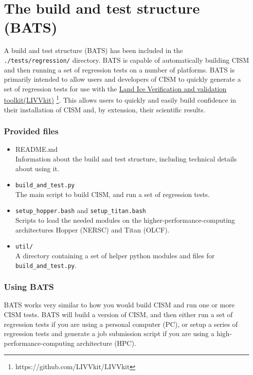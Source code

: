 \section{The build and test structure (BATS)}
\label{sc:bats}
A build and test structure (BATS) has been included in the \texttt{./tests/regression/} directory. BATS is capable of
automatically building CISM and then running a set of regression tests on a number of platforms. BATS is primarily
intended to allow users and developers of CISM to quickly generate a set of regression tests for use with the
\href{https://github.com/LIVVkit/LIVVkit}{Land Ice Verification and validation toolkit(LIVVkit)}
\footnote{https://github.com/LIVVkit/LIVVkit}. This allows users to quickly and easily build
confidence in their installation of CISM and, by extension, their scientific results. 

\subsubsection{Provided files}

\begin{itemize}
	\item README.md \\
		Information about the build and test structure, including technical details about using it.
    \item \texttt{build\_and\_test.py} \\
		The main script to build CISM, and run a set of regression tests.
    \item \texttt{setup\_hopper.bash} and \texttt{setup\_titan.bash} \\
        Scripts to load the needed modules on the higher-performance-computing architectures Hopper (NERSC) and Titan
        (OLCF).
    \item \texttt{util/} \\
        A directory containing a set of helper python modules and files for \texttt{build\_and\_test.py}.
\end{itemize}

\subsubsection{Using BATS} 

BATS works very similar to how you would build CISM and run one or more CISM tests. BATS will
build a version of CISM, and then either run a set of regression tests if you are using a personal computer (PC), or
setup a series of regression tests and generate a job submission script if you are using a high-performance-computing
architecture (HPC). 

